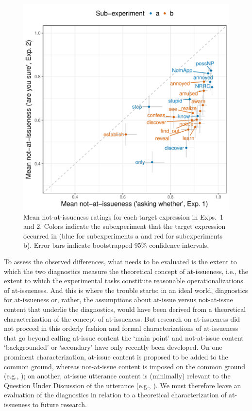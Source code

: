 \documentclass[11pt,fleqn]{article}
\newcommand{\6}{\mbox{$[\hspace*{-.6mm}[$}}
\newcommand{\9}{\mbox{$]\hspace*{-.6mm}]$}}
\begin{document}
\begin{figure}[!h]
\begin{center}

\includegraphics[width=12cm]{../results/ai-meta-analysis/graphs/correlation-bytrigger}

\end{center}
\caption{Mean not-at-issueness ratings for each target expression in Exps.~1 and 2. Colors indicate the subexperiment that the target expression occurred in (blue for subexperiments a and red for subexperiments b). Error bars indicate bootstrapped 95\% confidence intervals.}
\label{fig:ai-correlation}
\end{figure}


To assess the observed differences, what needs to be evaluated is the extent to which the two diagnostics measure the theoretical concept of at-issueness, i.e., the extent to which the experimental tasks constitute reasonable operationalizations of at-issueness. And this is where the trouble starts: in an ideal world, diagnostics for at-issueness or, rather, the assumptions about at-issue versus not-at-issue content that underlie the diagnostics, would have been derived from a theoretical characterization of the concept of at-issueness. But research on at-issueness did not proceed in this orderly fashion and formal characterizations of at-issueness that go beyond calling at-issue content the `main point' and not-at-issue content `backgrounded' or `secondary' have only recently been developed. On one prominent characterization, at-issue content is proposed to be added to the common ground, whereas not-at-issue content is imposed on the common ground (e.g., \citealt{murray2014,anderbois-etal2015}); on another, at-issue utterance content is (minimally) relevant to the Question Under Discussion of the utterance (e.g., \citealt{brst-salt10,brst-ar}). We must therefore leave an evaluation of the diagnostics in relation to a theoretical characterization of at-issueness to future research.
\end{document}

